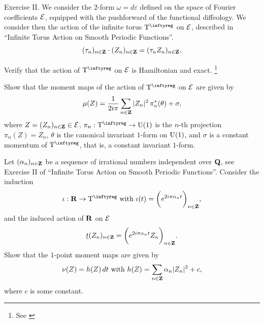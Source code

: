 \begin{Article}{Exercise II.}{}
  We consider the $2$-form $\omega = d \varepsilon$ defined on the space of Fourier coefficients $\mathcal{E}$,
  equipped with the pushforward of the functional diffeology.
  We consider then the action of the infinite torus $\Torus^\infty$ on $\mathcal{E}$,
  described in ``Infinite Torus Action on Smooth Periodic Functions''.
  $$
    (\tau_n)_{n\in\mathbf{Z}}\cdot(Z_n)_{n\in\mathbf{Z}} = (\tau_n Z_n)_{n\in\mathbf{Z}}.
    $$
  
   Verify that the action of $\Torus^\infty$ on $\mathcal{E}$ is Hamiltonian and exact.%
  \footnote{See \cite[Chapter 9]{PIZ13}}
  
   Show that the moment maps of the action of $\Torus^\infty$ on $\mathcal{E}$ are given by
  $$
    \mu (Z) = {1\over 2i\pi} \sum_{n\in\mathbf{Z}} \vert Z_n \vert^2 \, \pi_n^*(\theta) + \sigma,
    $$
  where $Z= (Z_n)_{n\in\mathbf{Z}} \in \mathcal{E}$, $\pi_n : \Torus^\infty \to \U(1)$ is the $n$-th projection $\pi_n (Z) =  Z_n$,
  $\theta$ is the canonical invariant $1$-form on $\mathrm{U}(1)$, and $\sigma$ is a constant momentum of $\Torus^\infty$, that is,
  a constant invariant $1$-form.
  
   Let $(\alpha_n)_{n\in\mathbf{Z}}$ be a sequence of irrational numbers independent over $\mathbf{Q}$,
  see Exercise II of ``Infinite Torus Action on Smooth Periodic Functions''.
  Consider the induction
  $$
    \iota : \RR \to \Torus^\infty \SpacedText{with} \iota(t) = \bigg(e^{2i\pi \alpha_n t}\bigg)_{n\in\ZZ},
    $$
  and the induced action of $\mathbf{R}$ on $\mathcal{E}$
  $$
    \underline{t}(Z_n)_{n\in\mathbf{Z}} = \bigg(e^{2i\pi \alpha_n t}  Z_n\bigg)_{n\in\mathbf{Z}}.
    $$
  Show that the $1$-point moment maps are given by
  $$
    \nu (Z) = h (Z) \, dt \ \text{with}\  h (Z) = \sum_{n\in\mathbf{Z}} \alpha_n \vert Z_n \vert^2 + c,
    $$
  where $c$ is some constant.
\end{Article}

